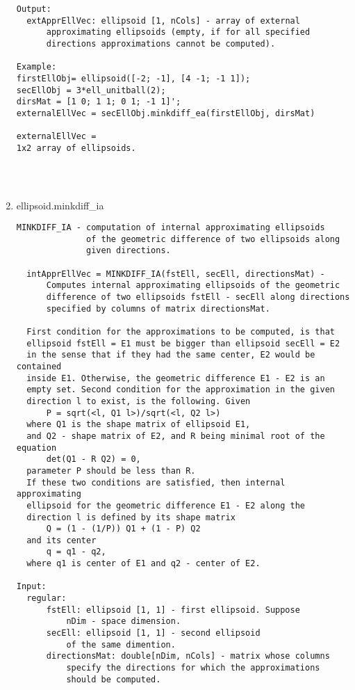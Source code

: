 \begin{enumerate}
\begin{lstlisting}
Output:
  extApprEllVec: ellipsoid [1, nCols] - array of external
      approximating ellipsoids (empty, if for all specified
      directions approximations cannot be computed).

Example:
firstEllObj= ellipsoid([-2; -1], [4 -1; -1 1]);
secEllObj = 3*ell_unitball(2);
dirsMat = [1 0; 1 1; 0 1; -1 1]';
externalEllVec = secEllObj.minkdiff_ea(firstEllObj, dirsMat)

externalEllVec =
1x2 array of ellipsoids.




\end{lstlisting}
\fontfamily{\familydefault}
\selectfont
\item {ellipsoid.minkdiff\_ia}
\selectfont
\begin{lstlisting}
MINKDIFF_IA - computation of internal approximating ellipsoids
              of the geometric difference of two ellipsoids along
              given directions.

  intApprEllVec = MINKDIFF_IA(fstEll, secEll, directionsMat) -
      Computes internal approximating ellipsoids of the geometric
      difference of two ellipsoids fstEll - secEll along directions
      specified by columns of matrix directionsMat.

  First condition for the approximations to be computed, is that
  ellipsoid fstEll = E1 must be bigger than ellipsoid secEll = E2
  in the sense that if they had the same center, E2 would be contained
  inside E1. Otherwise, the geometric difference E1 - E2 is an
  empty set. Second condition for the approximation in the given
  direction l to exist, is the following. Given
      P = sqrt(<l, Q1 l>)/sqrt(<l, Q2 l>)
  where Q1 is the shape matrix of ellipsoid E1,
  and Q2 - shape matrix of E2, and R being minimal root of the equation
      det(Q1 - R Q2) = 0,
  parameter P should be less than R.
  If these two conditions are satisfied, then internal approximating
  ellipsoid for the geometric difference E1 - E2 along the
  direction l is defined by its shape matrix
      Q = (1 - (1/P)) Q1 + (1 - P) Q2
  and its center
      q = q1 - q2,
  where q1 is center of E1 and q2 - center of E2.

Input:
  regular:
      fstEll: ellipsoid [1, 1] - first ellipsoid. Suppose
          nDim - space dimension.
      secEll: ellipsoid [1, 1] - second ellipsoid
          of the same dimention.
      directionsMat: double[nDim, nCols] - matrix whose columns
          specify the directions for which the approximations
          should be computed.


\end{lstlisting}
\end{enumerate}

